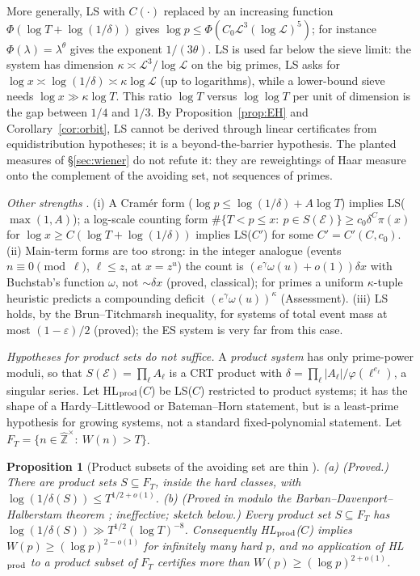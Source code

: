 \documentclass[11pt,reqno]{amsart}
\newtheorem{proposition}[theorem]{Proposition}
\theoremstyle{definition}
\newcommand{\Lc}{\mathcal L}
\begin{document}
More generally, LS with $C(\cdot)$ replaced by an increasing function
$\Phi(\log T+\log(1/\delta))$ gives $\log p\le\Phi(C_0\Lc^3(\log\Lc)^5)$; for instance $\Phi(\lambda)=\lambda^\theta$
gives the exponent $1/(3\theta)$.  LS is used far below the sieve limit: the
system has dimension $\kappa\asymp\Lc^3/\log\Lc$ on the big primes, LS asks for
$\log x\asymp\log(1/\delta)\asymp\kappa\log\Lc$ (up to logarithms), while a lower-bound sieve needs
$\log x\gg\kappa\log T$.  This ratio $\log T$ versus $\log\log T$ per unit of dimension is
the gap between $1/4$ and $1/3$.  By Proposition~\ref{prop:EH} and
Corollary~\ref{cor:orbit}, LS cannot be derived through linear certificates
from equidistribution hypotheses; it is a beyond-the-barrier hypothesis.
The planted measures of \S\ref{sec:wiener} do not refute it: they are
reweightings of Haar measure onto the complement of the avoiding set, not
sequences of primes.

\emph{Other strengths} \cite[\S\S2,5]{O16}.  (i) A Cram\'er form
($\log p\le\log(1/\delta)+A\log T$) implies LS($\max(1,A)$); a log-scale counting form
$\#\{T<p\le x:\ p\in S(\mathcal E)\}\ge c_0\delta^C\pi(x)$ for $\log x\ge C(\log T+\log(1/\delta))$ implies
LS($C'$) for some $C'=C'(C,c_0)$.  (ii) Main-term forms are too strong: in the integer analogue
(events $n\equiv0\pmod\ell$, $\ell\le z$, at $x=z^u$) the count is $(e^\gamma\omega(u)+o(1))\delta x$ with
Buchstab's function $\omega$, not $\sim\delta x$ (proved, classical); for primes a
uniform $\kappa$-tuple heuristic predicts a compounding deficit $(e^\gamma\omega(u))^\kappa$
(Assessment).  (iii) LS holds, by the Brun--Titchmarsh inequality, for
systems of total event mass at most $(1-\varepsilon)/2$ (proved); the ES system is
very far from this case.

\emph{Hypotheses for product sets do not suffice.}  A \emph{product system} has
only prime-power moduli, so that $S(\mathcal E)=\prod_\ell A_\ell$ is a CRT product with
$\delta=\prod_\ell|A_\ell|/\varphi(\ell^{e_\ell})$, a singular series.  Let HL$_{\rm prod}$($C$) be LS($C$)
restricted to product systems; it has the shape of a Hardy--Littlewood or
Bateman--Horn statement, but is a least-prime hypothesis for growing
systems, not a standard fixed-polynomial statement.  Let
$F_T=\{n\in\hat{\mathbb Z}^\times:\ W(n)>T\}$.

\begin{proposition}[Product subsets of the avoiding set are thin {\cite[Prop.~4.1, Cor.~4.2]{O16}}]\label{prop:product}
(a) (Proved.) There are product sets $S\subseteq F_T$, inside the hard classes,
with $\log(1/\delta(S))\le T^{1/2+o(1)}$.  (b) (Proved in \cite{O16} modulo the
Barban--Davenport--Halberstam theorem \cite[Ch.~29]{Dav}; ineffective; sketch below.)  Every
product set $S\subseteq F_T$ has $\log(1/\delta(S))\gg T^{1/2}(\log T)^{-8}$.  Consequently
HL$_{\rm prod}$($C$) implies $W(p)\ge(\log p)^{2-o(1)}$ for infinitely many hard $p$, and
no application of HL$_{\rm prod}$ to a product subset of $F_T$ certifies more
than $W(p)\ge(\log p)^{2+o(1)}$.
\end{proposition}
\end{document}
